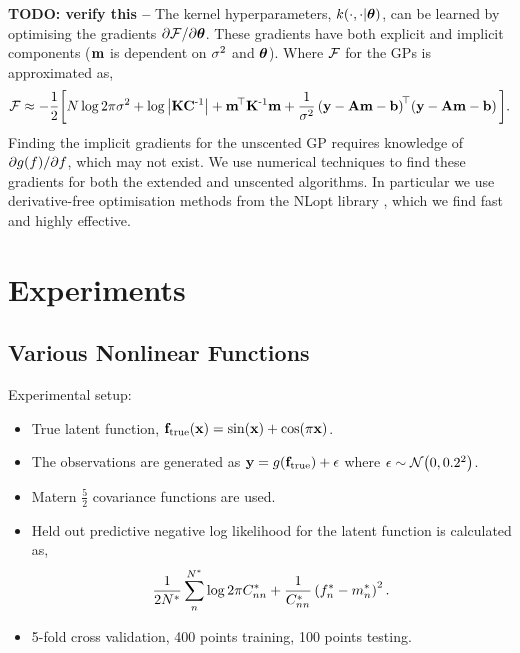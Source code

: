 \documentclass{article} %
\begin{document}
\textbf{TODO: verify this --} The kernel hyperparameters,
$k\!\left({{\cdot}, {\cdot|\boldsymbol\theta}}\right)$, can be learned by optimising the gradients
$\partial\mathcal{F}/\partial\boldsymbol\theta$. These gradients have both explicit and
implicit components ($\mathbf{m}$ is dependent on $\sigma^2$ and $\boldsymbol\theta$). Where
$\mathcal{F}$ for the GPs is approximated as,
\begin{equation}
    \mathcal{F} \approx - \frac{1}{2} \bigg[
        N\log{2\pi\ensuremath{\sigma^2}} + \log\left|{\mathbf{K}\mathbf{C}^{\text{-}1}}\right|
    + \mathbf{m}^{\!\top}\mathbf{K}^{\text{-}1} \mathbf{m}
    + \frac{1}{\sigma^2}
        \left({\mathbf{y} - \mathbf{A}\mathbf{m} - \mathbf{b}}\right)^{\!\top}\!
        \left({\mathbf{y} - \mathbf{A}\mathbf{m} - \mathbf{b}}\right)
    \bigg].
    \label{eq:fengygp}
\end{equation}
Finding the implicit gradients for the unscented GP requires knowledge of
$\partial g\!\left({{f}}\right)\!/\partial f$, which may not exist. We use
numerical techniques to find these gradients for both the extended and
unscented algorithms. In particular we use derivative-free optimisation methods
from the NLopt library \cite{JohnsonNLOPT}, which we find fast and highly
effective.


\section{Experiments}
\label{sec:experiments}

\subsection{Various Nonlinear Functions}
\label{sec:exptoy}

Experimental setup:
\begin{itemize}

    \item True latent function, $\mathbf{f}_{\text{true}}\!\left({\mathbf{x}}\right) =
        \sin\!\left({\mathbf{x}}\right) + \cos\!\left({\pi\mathbf{x}}\right)$.

    \item The observations are generated as $\mathbf{y} =
        g\!\left({{\mathbf{f}_\text{true}}}\right) + \epsilon$ where $\epsilon \sim \mathcal{N}\!\left({0,
            0.2^2}\right)$.
    
    \item Matern $\frac{5}{2}$ covariance functions are used. 

    \item Held out predictive negative log likelihood for the latent function
        is calculated as,
        \begin{equation}
            \frac{1}{2N^{*}} \sum^{N^{*}}_n \log{2\pi\ensuremath{C}\ensuremath{^{*}}_{nn}}
                + \frac{1}{C^{*}_{nn}} \left({f^{*}_n -
                    m^{*}_n}\right)^2.
        \end{equation}

    \item 5-fold cross validation, 400 points training, 100 points testing.

\end{itemize}
\end{document}
